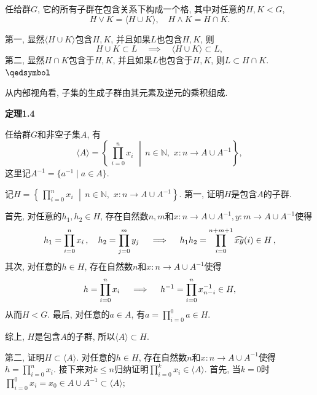\documentclass[UTF8]{ctexart}
\begin{document}
任给群$G$, 它的所有子群在包含关系下构成一个格, 其中对任意的$H,K<G$,
\[
    H\lor K=\langle H\cup K\rangle,\quad H\land K=H\cap K.
\]


第一, 显然$\langle H\cup K\rangle$包含$H,K$, 并且如果$L$也包含$H,K$, 则
\[
    H\cup K\subset L\quad\implies\quad\langle H\cup K\rangle\subset L,
\]
第二, 显然$H\cap K$包含于$H,K$, 并且如果$L$也包含于$H,K$, 则$L\subset H\cap K$.
\hfill $\qedsymbol$





\newpage

从内部视角看, 子集的生成子群由其元素及逆元的乘积组成.

\vspace{10pt}

\hypertarget{sec:定理1.4}{}
\noindent\textbf{定理1.4}

任给群$G$和非空子集$A$, 有
\[
    \langle A\rangle=\left\{\,\prod_{i=0}^nx_i\,\,\middle\vert\,
    n\in\mathbb{N},\,\,x:n\to A\cup A^{-1}\right\},
\]
这里记$A^{-1}=\{a^{-1}\mid a\in A\}$.


记$H=\displaystyle\left\{\,\prod_{i=0}^nx_i\,\,\middle\vert\,
n\in\mathbb{N},\,\,x:n\to A\cup A^{-1}\right\}$.
第一, 证明$H$是包含$A$的子群.

\vspace{6pt}
首先, 对任意的$h_1,h_2\in H$, 存在自然数$n,m$和$x:n\to A\cup A^{-1},
y:m\to A\cup A^{-1}$使得
\vspace{3pt}
\[
    h_1=\prod_{i=0}^nx_i\,,\quad h_2=\prod_{j=0}^my_j\quad\implies\quad
    h_1h_2=\prod_{i=0}^{n+m+1}\wideparen{xy}(i)\in H\,,\\[3pt]
\]
其次, 对任意的$h\in H$, 存在自然数$n$和$x:n\to A\cup A^{-1}$使得
\vspace{3pt}
\[
    h=\prod_{i=0}^nx_i\quad\implies\quad
    h^{-1}=\prod_{i=0}^nx_{n-i}^{-1}\in H,\\[3pt]
\]
从而$H<G$. 最后, 对任意的$a\in A$, 有$\displaystyle a=\prod_{i=0}^0a\in H$.

\vspace{3pt}
综上, $H$是包含$A$的子群, 所以$\langle A\rangle\subset H$.

\vspace{3pt}
第二, 证明$H\subset\langle A\rangle$. 对任意的$h\in H$,
存在自然数$n$和$x:n\to A\cup A^{-1}$使得$\displaystyle h=\prod_{i=0}^nx_i$.
接下来对$k\leqslant n$归纳证明$\displaystyle\prod_{i=0}^kx_i\in\langle A\rangle$.
首先, 当$k=0$时$\displaystyle
\prod_{i=0}^0x_i=x_0\in A\cup A^{-1}\subset\langle A\rangle$;
\end{document}
